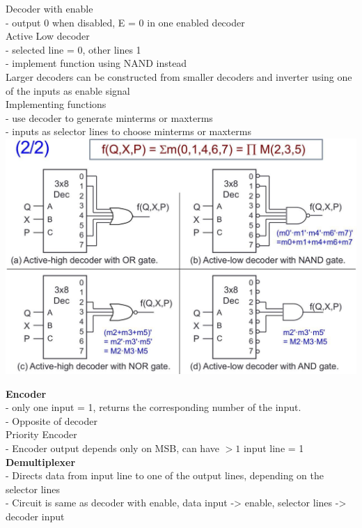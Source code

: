 \documentclass[10pt, a4paper]{article}
\begin{document}
\begin{multicols*}{3}
		Decoder with enable\\
		- output 0 when disabled, E = 0 in one enabled decoder\\

		Active Low decoder\\
		- selected line = 0, other lines 1\\
		- implement function using NAND instead\\

		Larger decoders can be constructed from smaller decoders and inverter using one of the inputs as enable signal\\

		Implementing functions\\
		- use decoder to generate minterms or maxterms\\
		- inputs as selector lines to choose minterms or maxterms\\
		\includegraphics[scale=.23]{./assets/decoderFunctions}

		\textbf{Encoder}\\
		- only one input = 1, returns the corresponding number of the input.\\
		- Opposite of decoder\\

		Priority Encoder\\
		- Encoder output depends only on MSB, can have $ > 1$ input line = 1\\

		\textbf{Demultiplexer}\\
		- Directs data from input line to one of the output lines, depending on the selector lines\\
		- Circuit is same as decoder with enable, data input -> enable, selector lines -> decoder input\\


\end{multicols*}
\end{document}
